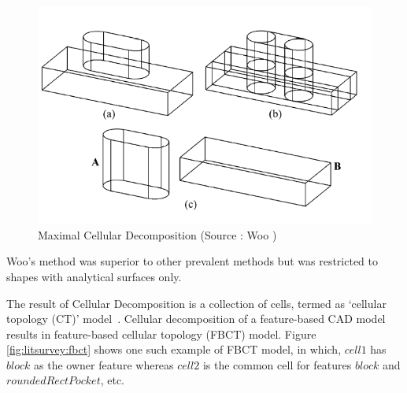 \begin{figure}[!h]
\centering     %
\includegraphics[width=0.7\linewidth,valign=t]{../Common/images/WooMax}
\caption{Maximal Cellular Decomposition (Source : Woo \cite{Woo2003})}
\label{fig:litsurvey:maxcd}
\end{figure}


Woo's method was superior to other prevalent methods but was restricted to shapes with analytical surfaces only.
 


 
 
 
The result of Cellular Decomposition is a collection of cells, termed as `cellular topology (CT)' model~\cite{Chen2006}. 
Cellular decomposition of a feature-based CAD model results in feature-based cellular topology (FBCT) model. Figure \ref{fig:litsurvey:fbct} shows one such example of FBCT model, in which, $cell 1$ has $block$ as the owner feature whereas $cell 2$ is the common cell for features $block$ and $roundedRectPocket$, etc. %

